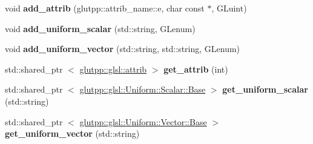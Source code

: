\begin{DoxyCompactItemize}
\item 
\hypertarget{classglutpp_1_1glsl_1_1program_af2403d0061bcb6e7eff6fd0e27ef57cf}{void {\bfseries add\-\_\-attrib} (glutpp\-::attrib\-\_\-name\-::e, char const $\ast$, \-G\-Luint)}\label{classglutpp_1_1glsl_1_1program_af2403d0061bcb6e7eff6fd0e27ef57cf}

\item 
\hypertarget{classglutpp_1_1glsl_1_1program_a73343348c02d88760f98af88e0a84f45}{void {\bfseries add\-\_\-uniform\-\_\-scalar} (std\-::string, \-G\-Lenum)}\label{classglutpp_1_1glsl_1_1program_a73343348c02d88760f98af88e0a84f45}

\item 
\hypertarget{classglutpp_1_1glsl_1_1program_a35275f3f95ea83f2023364f585626845}{void {\bfseries add\-\_\-uniform\-\_\-vector} (std\-::string, std\-::string, \-G\-Lenum)}\label{classglutpp_1_1glsl_1_1program_a35275f3f95ea83f2023364f585626845}

\item 
\hypertarget{classglutpp_1_1glsl_1_1program_ab77d4536050a8ee71796b3e12fd73ef8}{std\-::shared\-\_\-ptr\*
$<$ \hyperlink{classglutpp_1_1glsl_1_1attrib}{glutpp\-::glsl\-::attrib} $>$ {\bfseries get\-\_\-attrib} (int)}\label{classglutpp_1_1glsl_1_1program_ab77d4536050a8ee71796b3e12fd73ef8}

\item 
\hypertarget{classglutpp_1_1glsl_1_1program_a1ad4caea22dd6d3bdd788cf40ac32fd2}{std\-::shared\-\_\-ptr\*
$<$ \hyperlink{classglutpp_1_1glsl_1_1Uniform_1_1Scalar_1_1Base}{glutpp\-::glsl\-::\-Uniform\-::\-Scalar\-::\-Base} $>$ {\bfseries get\-\_\-uniform\-\_\-scalar} (std\-::string)}\label{classglutpp_1_1glsl_1_1program_a1ad4caea22dd6d3bdd788cf40ac32fd2}

\item 
\hypertarget{classglutpp_1_1glsl_1_1program_aa5920f8b94fb3503b6ce9c883a29fcdf}{std\-::shared\-\_\-ptr\*
$<$ \hyperlink{classglutpp_1_1glsl_1_1Uniform_1_1Vector_1_1Base}{glutpp\-::glsl\-::\-Uniform\-::\-Vector\-::\-Base} $>$ {\bfseries get\-\_\-uniform\-\_\-vector} (std\-::string)}\label{classglutpp_1_1glsl_1_1program_aa5920f8b94fb3503b6ce9c883a29fcdf}

\end{DoxyCompactItemize}
